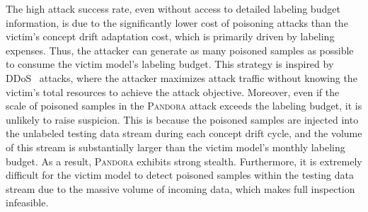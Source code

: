 \documentclass[lettersize,journal]{IEEEtran}
\newcommand{\pandora}{{\scshape Pandora}\xspace}
\begin{document}
The high attack success rate, even without access to detailed labeling budget information, is due to the significantly lower cost of poisoning attacks than the victim’s concept drift adaptation cost, which is primarily driven by labeling expenses.
Thus, the attacker can generate as many poisoned samples as possible to consume the victim model’s labeling budget.
This strategy is inspired by DDoS~\cite{mirkovic2004taxonomy} attacks, where the attacker maximizes attack traffic without knowing the victim’s total resources to achieve the attack objective.
Moreover, even if the scale of poisoned samples in the \pandora attack exceeds the labeling budget, it is unlikely to raise suspicion.
This is because the poisoned samples are injected into the unlabeled testing data stream during each concept drift cycle, and the volume of this stream is substantially larger than the victim model’s monthly labeling budget.
As a result, \pandora exhibits strong stealth. 
Furthermore, it is extremely difficult for the victim model to detect poisoned samples within the testing data stream due to the massive volume of incoming data, which makes full inspection infeasible.

\end{document}

